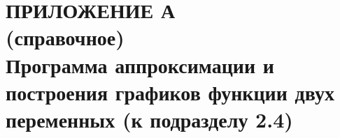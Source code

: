 \renewcommand{\thefigure}{\Asbuk{section}.\arabic{figure}}
\renewcommand{\thetable}{\Asbuk{section}.\arabic{table}}
\renewcommand{\thelstlisting}{\Asbuk{section}.\arabic{lstlisting}}

\pagestyle{fancy}
\fancyhf{} %
\fancyfoot[R]{\thepage}
\renewcommand{\headrulewidth}{0pt}
\renewcommand{\footrulewidth}{0pt}

\setlength{\headheight}{10mm}
\setlength{\headsep}{\baselineskip}

\section*{ПРИЛОЖЕНИЕ А\\(справочное)\\ Программа аппроксимации и построения графиков
	функции двух переменных (к подразделу 2.4)}

\thispagestyle{plain}
\setcounter{section}{1}
\setcounter{figure}{0}
\setcounter{table}{0}
\setcounter{lstlisting}{0}

